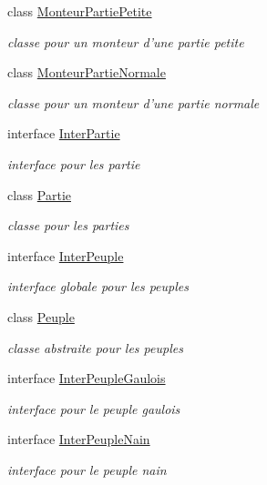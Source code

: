 \begin{DoxyCompactItemize}
class \hyperlink{class_small_world_1_1_monteur_partie_petite}{Monteur\-Partie\-Petite}
\begin{DoxyCompactList}\small\item\em classe pour un monteur d'une partie petite \end{DoxyCompactList}\item 
class \hyperlink{class_small_world_1_1_monteur_partie_normale}{Monteur\-Partie\-Normale}
\begin{DoxyCompactList}\small\item\em classe pour un monteur d'une partie normale \end{DoxyCompactList}\item 
interface \hyperlink{interface_small_world_1_1_inter_partie}{Inter\-Partie}
\begin{DoxyCompactList}\small\item\em interface pour les partie \end{DoxyCompactList}\item 
class \hyperlink{class_small_world_1_1_partie}{Partie}
\begin{DoxyCompactList}\small\item\em classe pour les parties \end{DoxyCompactList}\item 
interface \hyperlink{interface_small_world_1_1_inter_peuple}{Inter\-Peuple}
\begin{DoxyCompactList}\small\item\em interface globale pour les peuples \end{DoxyCompactList}\item 
class \hyperlink{class_small_world_1_1_peuple}{Peuple}
\begin{DoxyCompactList}\small\item\em classe abstraite pour les peuples \end{DoxyCompactList}\item 
interface \hyperlink{interface_small_world_1_1_inter_peuple_gaulois}{Inter\-Peuple\-Gaulois}
\begin{DoxyCompactList}\small\item\em interface pour le peuple gaulois \end{DoxyCompactList}\item 
interface \hyperlink{interface_small_world_1_1_inter_peuple_nain}{Inter\-Peuple\-Nain}
\begin{DoxyCompactList}\small\item\em interface pour le peuple nain \end{DoxyCompactList}\item 

\end{DoxyCompactItemize}
